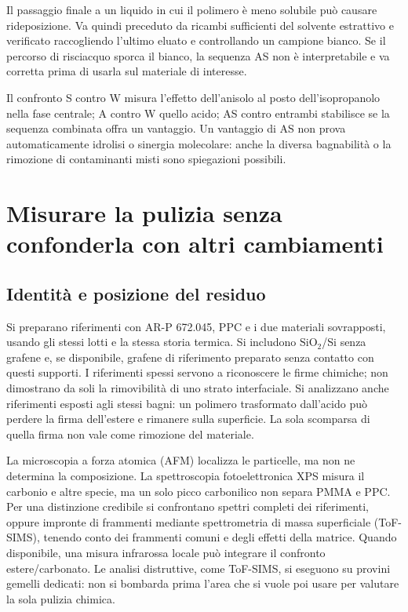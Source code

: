 \documentclass[11pt,reqno]{amsart}
\numberwithin{equation}{section}
\newcommand{\SiO}{\ensuremath{\mathrm{SiO}_2}}
\begin{document}
Il passaggio finale a un liquido in cui il polimero \`e meno solubile
pu\`o causare rideposizione. Va quindi preceduto da ricambi sufficienti
del solvente estrattivo e verificato raccogliendo l'ultimo eluato e
controllando un campione bianco. Se il percorso di risciacquo sporca
il bianco, la sequenza AS non \`e interpretabile e va corretta prima
di usarla sul materiale di interesse.

Il confronto S contro W misura l'effetto dell'anisolo al posto
dell'isopropanolo nella fase centrale; A contro W quello acido;
AS contro entrambi stabilisce se
la sequenza combinata offra un vantaggio. Un vantaggio di AS non prova
automaticamente idrolisi o sinergia molecolare: anche la diversa
bagnabilit\`a o la rimozione di contaminanti misti sono spiegazioni
possibili.

\section{Misurare la pulizia senza confonderla con altri cambiamenti}

\subsection{Identit\`a e posizione del residuo}
Si preparano riferimenti con AR-P 672.045, PPC e i due materiali
sovrapposti, usando gli stessi lotti e la stessa storia termica. Si
includono \SiO/Si senza grafene e, se disponibile, grafene di
riferimento preparato senza contatto con questi supporti.
I riferimenti spessi servono a riconoscere le firme chimiche;
non dimostrano da soli la rimovibilit\`a di uno strato interfaciale.
Si analizzano anche riferimenti esposti agli stessi bagni: un polimero
trasformato dall'acido pu\`o perdere la firma dell'estere e rimanere
sulla superficie. La sola scomparsa di quella firma non vale come
rimozione del materiale.

La microscopia a forza atomica (AFM) localizza le particelle, ma non
ne determina la composizione. La spettroscopia fotoelettronica XPS
misura il carbonio e altre specie, ma un solo picco carbonilico non
separa PMMA e PPC. Per una distinzione credibile si confrontano
spettri completi dei riferimenti, oppure impronte di frammenti mediante
spettrometria di massa superficiale (ToF-SIMS), tenendo conto dei
frammenti comuni e degli effetti della matrice. Quando disponibile,
una misura infrarossa locale pu\`o integrare il confronto estere/carbonato.
Le analisi distruttive, come ToF-SIMS, si eseguono su provini gemelli
dedicati: non si bombarda prima l'area che si vuole poi usare per
valutare la sola pulizia chimica.
\end{document}
